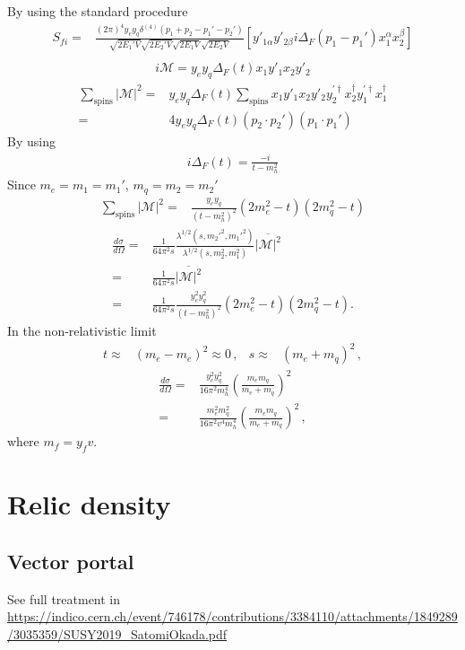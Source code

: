 \begin{frame}
By using the standard procedure
\begin{align}
      S_{fi}
    =&\frac{(2\pi)^4y_e y_q \delta^{(4)}\left(p_1+p_2-p_1'-p_2'\right) }{\sqrt{2 E_1'V}\sqrt{2 E_2'V}\sqrt{2 E_1V}\sqrt{2 E_2V}}
 \left[y'_{1\alpha}y'_{2\beta}i\Delta_F(p_1-p_1')x_1^{\alpha}x_2^{\beta}\right] \nonumber\\
\end{align}
\begin{align}
 i\mathcal{M}=y_e y_q\Delta_F(t) x_1y'_1x_2y'_2 
\end{align}
\begin{align}
\sum_{\text{spins}} |\mathcal{M}|^2=&y_e y_q\Delta_F(t) \sum_{\text{spins}}  x_1y'_1x_2y'_2  y^{\prime\dagger}_2x_2^{\dagger} y^{\prime\dagger}_1x^{\dagger}_1 \nonumber\\
=& 4 y_e y_q\Delta_F(t) \left( p_2\cdot p_2' \right) \left(p_1\cdot p_1'  \right)
\end{align}
By using
\begin{align}
  i\Delta_F(t)=\frac{-i}{t-m_h^2}
\end{align}
Since $m_e=m_1=m_1'$, $m_q=m_2=m_2'$
\begin{align}
   \sum_{\text{spins}} |\mathcal{M}|^2=&\frac{y_ey_q}{\left( t-m_h^2 \right)^2} \left(2m_e^2-t\right)\left(2m_q^2-t\right)
\end{align}
\begin{align}
     \frac{d\sigma}{d\Omega}=&\frac{1}{64\pi^2s}
\frac{\lambda^{1/2}(s,{m_2'}^2,{m_1'}^2)}{\lambda^{1/2}(s,m_2^2,m_1^2)}
\overline{|\mathcal{M}|^2} \nonumber\\
=&\frac{1}{64\pi^2s}\overline{|\mathcal{M}|^2} \nonumber\\
=&\frac{1}{64\pi^2s}\frac{y_e^2y_q^2}{\left( t-m_h^2 \right)^2}\left(2m_e^2-t\right)\left(2m_q^2-t\right) .
\end{align}
In the non-relativistic limit
\begin{align}
  t\approx& (m_e-m_e)^2\approx 0\,,& 
  s\approx& (m_e+m_q)^2\,,
\end{align}
\begin{align}
       \frac{d\sigma}{d\Omega}
                    =&\frac{y_e^2y_q^2}{16\pi^2m_h^4}\left( \frac{m_em_q}{m_e+m_q} \right)^2 \nonumber\\
=&\frac{m_e^2m_q^2}{16\pi^2v^4 m_h^4}\left( \frac{m_em_q}{m_e+m_q} \right)^2\,,
\end{align}
where $m_f=y_f v$.

\section{Relic density}
\subsection{Vector portal}
See full treatment in \url{https://indico.cern.ch/event/746178/contributions/3384110/attachments/1849289/3035359/SUSY2019_SatomiOkada.pdf}

\end{frame}

